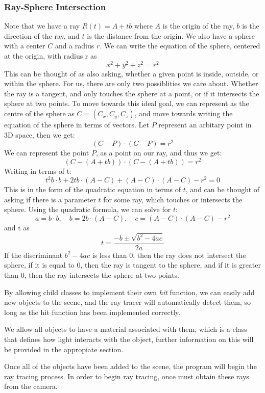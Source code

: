 \documentclass[../main.tex]{subfiles}
\begin{document}
\subsubsection{Ray-Sphere Intersection}
Note that we have a ray $R(t) = A + tb$ where $A$ is the origin of the ray, $b$ is the direction of the ray, and $t$ is the distance from the origin.
We also have a sphere with a center $C$ and a radius $r$.
We can write the equation of the sphere, centered at the origin, with radius r as
$$
x^2 + y^2 + z^2 = r^2
$$
This can be thought of as also asking, whether a given point is inside, outside, or within the sphere.
For us, there are only two possiblities we care about. Whether the ray is a tangent, and only touches
the sphere at a point, or if it intersects the sphere at two points.
To move towards this ideal goal, we can represent as the centre of the sphere as $C = (C_x, C_y, C_z)$, and move towards writing the equation of the sphere in terms of vectors.
Let $P$ represent an arbitary point in 3D space, then we get:
$$
(C-P) \cdot (C-P) = r^2
$$
We can represent the point $P$, as a point on our ray, and thus we get:
$$
(C - (A + tb)) \cdot (C - (A + tb)) = r^2
$$
Writing in terms of t:
$$
t^2b \cdot b + 2t b \cdot (A - C) + (A - C) \cdot (A - C) - r^2 = 0
$$
This is in the form of the quadratic equation in terms of $t$, and can be thought of asking if there is a parameter $t$ for some ray, which touches or intersects the sphere.
Using the quadratic formula, we can solve for $t$:
$$
a = b \cdot b, \quad b = 2b \cdot (A - C), \quad c = (A - C) \cdot (A - C) - r^2
$$
and t as 
$$
t = \frac{-b \pm \sqrt{b^2 - 4ac}}{2a}
$$
If the discriminant $b^2 - 4ac$ is less than 0, then the ray does not intersect the sphere,
if it is equal to 0, then the ray is tangent to the sphere, and if it is greater than 0, then the ray intersects the sphere at two points.

By allowing child classes to implement their own \textit{hit} function, we can easily add new objects to the scene, and the ray tracer will automatically detect them,
so long as the hit function has been implemented correctly.

We allow all objects to have a material associated with them, which is a class that defines how light interacts with the object, further 
information on this will be provided in the appropiate section.

Once all of the objects have been added to the scene, the program will begin the ray tracing process. In order to begin ray tracing, once must 
obtain these rays from the camera.
\end{document}
